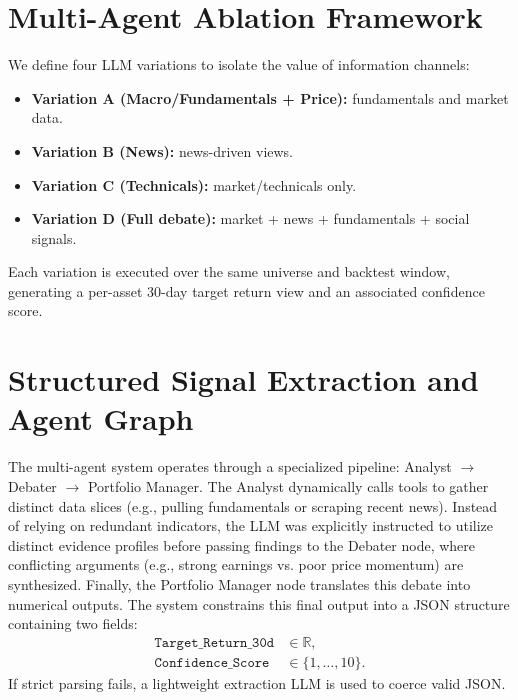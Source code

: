 \documentclass[12pt]{report}
\begin{document}
\section{Multi-Agent Ablation Framework}
We define four LLM variations to isolate the value of information channels:
\begin{itemize}
    \item \textbf{Variation A (Macro/Fundamentals + Price):} fundamentals and market data.
    \item \textbf{Variation B (News):} news-driven views.
    \item \textbf{Variation C (Technicals):} market/technicals only.
    \item \textbf{Variation D (Full debate):} market + news + fundamentals + social signals.
\end{itemize}
Each variation is executed over the same universe and backtest window, generating a per-asset 30-day target return view and an associated confidence score.

\section{Structured Signal Extraction and Agent Graph}
The multi-agent system operates through a specialized pipeline: Analyst $\rightarrow$ Debater $\rightarrow$ Portfolio Manager. The Analyst dynamically calls tools to gather distinct data slices (e.g., pulling fundamentals or scraping recent news). Instead of relying on redundant indicators, the LLM was explicitly instructed to utilize distinct evidence profiles before passing findings to the Debater node, where conflicting arguments (e.g., strong earnings vs. poor price momentum) are synthesized. Finally, the Portfolio Manager node translates this debate into numerical outputs.
The system constrains this final output into a JSON structure containing two fields:
\begin{align}
    \texttt{Target\_Return\_30d} & \in \mathbb{R},     \\
    \texttt{Confidence\_Score}   & \in \{1,\dots,10\}.
\end{align}
If strict parsing fails, a lightweight extraction LLM is used to coerce valid JSON.
\end{document}
